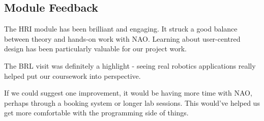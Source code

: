 \documentclass[conference]{IEEEtran}
\begin{document}
\subsection{Module Feedback} The HRI module has been brilliant and engaging. It struck a good balance between theory and hands-on work with NAO. Learning about user-centred design has been particularly valuable for our project work.

The BRL visit was definitely a highlight - seeing real robotics applications really helped put our coursework into perspective.

If we could suggest one improvement, it would be having more time with NAO, perhaps through a booking system or longer lab sessions. This would've helped us get more comfortable with the programming side of things.



\end{document}
